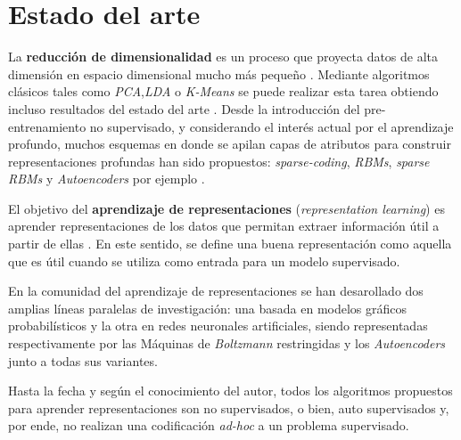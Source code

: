 \section{Estado del arte}

La \textbf{reducción de dimensionalidad} es un proceso que proyecta datos de alta dimensión en espacio dimensional mucho más pequeño \cite{sarveniazi}. Mediante algoritmos clásicos tales como \textit{PCA},\textit{LDA} o \textit{K-Means} se puede realizar esta tarea obtiendo incluso resultados del estado del arte \cite{Coates2012}. Desde la introducción del pre-entrenamiento no supervisado, y considerando el interés actual por el aprendizaje profundo, muchos esquemas en donde se apilan capas de atributos para construir representaciones profundas han sido propuestos: \textit{sparse-coding}, \textit{RBMs}, \textit{sparse RBMs} y \textit{Autoencoders} por ejemplo \cite{coates}.

El objetivo del \textbf{aprendizaje de representaciones} (\textit{representation learning}) es aprender representaciones de los datos que permitan extraer información útil a partir de ellas \cite{DBLP:journals/corr/abs-1206-5538}. En este sentido, se define una buena representación como aquella que es útil cuando se utiliza como entrada para un modelo supervisado.

En la comunidad del aprendizaje de representaciones se han desarollado dos amplias líneas paralelas de investigación: una basada en modelos gráficos probabilísticos y la otra en redes neuronales artificiales, siendo representadas respectivamente por las Máquinas de \textit{Boltzmann} restringidas y los \textit{Autoencoders} junto a todas sus variantes.

Hasta la fecha y según el conocimiento del autor, todos los algoritmos propuestos para aprender representaciones son no supervisados, o bien, auto supervisados y, por ende, no realizan una codificación \textit{ad-hoc} a un problema supervisado.